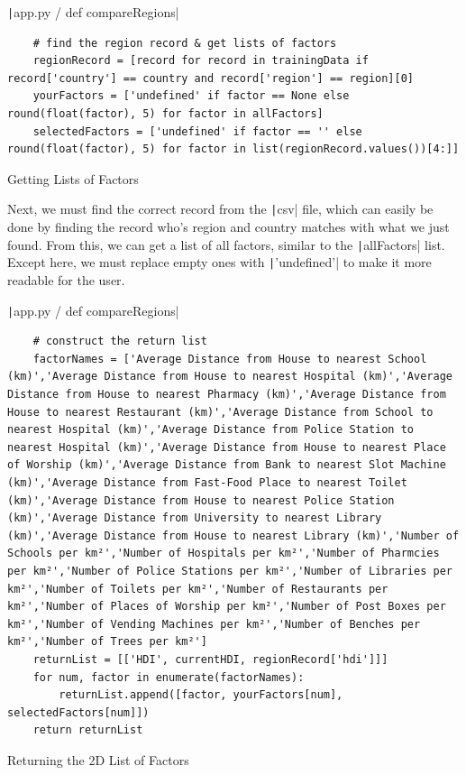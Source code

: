 \documentclass[12pt]{report}
\newcommand{\pil}[1]{\protect\texttt|#1|}
\begin{document}
\begin{listing}[H]
\pil{app.py / def compareRegions}
\begin{verbatim}
    # find the region record & get lists of factors
    regionRecord = [record for record in trainingData if record['country'] == country and record['region'] == region][0]
    yourFactors = ['undefined' if factor == None else round(float(factor), 5) for factor in allFactors]
    selectedFactors = ['undefined' if factor == '' else round(float(factor), 5) for factor in list(regionRecord.values())[4:]]
\end{verbatim}
\caption{Getting Lists of Factors}\label{cs:listsOfFactors}
\end{listing}

Next, we must find the correct record from the \pil{csv} file, which can easily be done by finding the record who's region and country matches with what we just found. From this, we can get a list of all factors, similar to the \pil{allFactors} list. Except here, we must replace empty ones with \pil{'undefined'} to make it more readable for the user.

\begin{listing}[H]
\pil{app.py / def compareRegions}
\begin{verbatim}
    # construct the return list
    factorNames = ['Average Distance from House to nearest School (km)','Average Distance from House to nearest Hospital (km)','Average Distance from House to nearest Pharmacy (km)','Average Distance from House to nearest Restaurant (km)','Average Distance from School to nearest Hospital (km)','Average Distance from Police Station to nearest Hospital (km)','Average Distance from House to nearest Place of Worship (km)','Average Distance from Bank to nearest Slot Machine (km)','Average Distance from Fast-Food Place to nearest Toilet (km)','Average Distance from House to nearest Police Station (km)','Average Distance from University to nearest Library (km)','Average Distance from House to nearest Library (km)','Number of Schools per km²','Number of Hospitals per km²','Number of Pharmcies per km²','Number of Police Stations per km²','Number of Libraries per km²','Number of Toilets per km²','Number of Restaurants per km²','Number of Places of Worship per km²','Number of Post Boxes per km²','Number of Vending Machines per km²','Number of Benches per km²','Number of Trees per km²']
    returnList = [['HDI', currentHDI, regionRecord['hdi']]]
    for num, factor in enumerate(factorNames):
        returnList.append([factor, yourFactors[num], selectedFactors[num]])
    return returnList
\end{verbatim}
\caption{Returning the 2D List of Factors}\label{cs:return2Dlist}
\end{listing}
\end{document}
